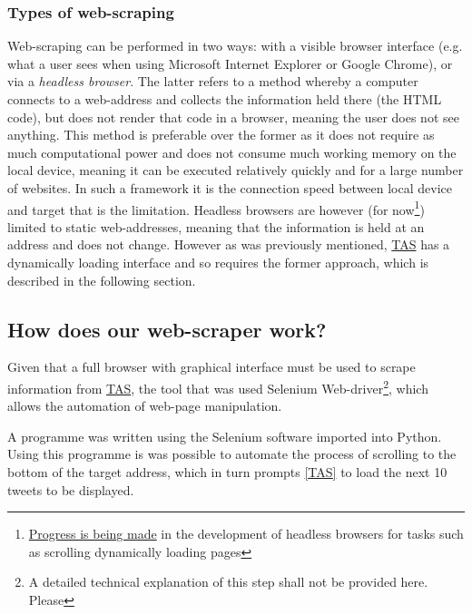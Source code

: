 \documentclass{article}
\begin{document}
\subsubsection{Types of web-scraping}
\label{sec-3-1-1}
Web-scraping can be performed in two ways: with a visible browser interface (e.g. what a user sees when using Microsoft Internet Explorer or Google Chrome), or via a \emph{headless browser}. The latter refers to a method whereby a computer connects to a web-address and collects the information held there (the HTML code), but does not render that code in a browser, meaning the user does not see anything. This method is preferable over the former as it does not require as much computational power and does not consume much working memory on the local device, meaning it can be executed relatively quickly and for a large number of websites. In such a framework it is the connection speed between local device and target that is the limitation. Headless browsers are however (for now\footnote{\href{http://stackoverflow.com/questions/34942103/headless-endless-scroll-selenium}{Progress is being made} in the development of headless browsers for tasks such as scrolling dynamically loading pages}) limited to static web-addresses, meaning that the information is held at an address and does not change. However as was previously mentioned, \hyperref[TAS]{TAS} has a dynamically loading interface and so requires the former approach, which is described in the following section.


\subsection{How does our web-scraper work?}
\label{sec-3-2}
Given that a full browser with graphical interface must be used to scrape information from \hyperref[TAS]{TAS}, the tool that was used Selenium Web-driver\footnote{A detailed technical explanation of this step shall not be provided here. Please}, which allows the automation of web-page manipulation.

A programme was written using the Selenium software imported into Python. Using this programme is was possible to automate the process of scrolling to the bottom of the target address, which in turn prompts \ref{TAS} to load the next 10 tweets to be displayed.
\end{document}
